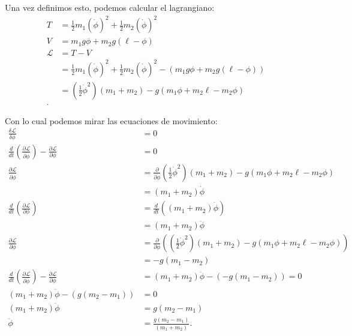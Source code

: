 \documentclass{report}
\begin{document}
Una vez definimos esto, podemos calcular el lagrangiano:
\begin{align*}
  T &= \frac{1}{2}m_1\left( \dot{\phi} \right)^2 + \frac{1}{2}m_2\left( \dot{\phi} \right)^2 \\
  V &= m_1g\phi + m_2g\left( \ell - \phi \right)  \\
  \mathcal{L} &= T - V \\
  &= \frac{1}{2}m_1\left( \dot{\phi} \right)^2 + \frac{1}{2}m_2\left( \dot{\phi} \right)^2 - \left( m_1g\phi + m_2g\left(\ell-\phi\right)\right)\\
  &= \left( \frac{1}{2}\dot{\phi}^2 \right)\left( m_1 + m_2 \right) - g\left( m_1\phi + m_2\ell - m_2\phi \right)  \\
.\end{align*}

Con lo cual podemos mirar las ecuaciones de movimiento:
\begin{align*}
  \frac{\delta \mathcal{L}}{\delta \phi} &= 0 \\
  \frac{d}{dt}\left( \frac{\partial \mathcal{L}}{\partial \dot{\phi}}  \right) - \frac{\partial \mathcal{L}}{\partial \phi} &= 0 \\
  \frac{\partial \mathcal{L}}{\partial \dot{\phi}} &= \frac{\partial}{\partial \dot{\phi}} \left( \frac{1}{2}\dot{\phi}^2 \right)\left( m_1 + m_2 \right) - g\left( m_1\phi + m_2\ell - m_2\phi \right) \\
						   &= \left( m_1 + m_2 \right) \dot{\phi} \\
  \frac{d}{dt}\left( \frac{\partial \mathcal{L}}{\partial \phi}  \right) &= \frac{d}{dt}\left( \left( m_1 + m_2 \right)\dot{\phi}  \right)  \\
									 &= \left( m_1 + m_2 \right) \ddot{\phi} \\
  \frac{\partial \mathcal{L}}{\partial \phi} &= \frac{\partial}{\partial \phi} \left(\left( \frac{1}{2}\dot{\phi}^2 \right)\left( m_1 + m_2 \right) - g\left( m_1\phi + m_2\ell - m_2\phi \right)  \right)  \\
  &= -g\left( m_1 - m_2 \right)  \\
  \frac{d}{dt}\left( \frac{\partial \mathcal{L}}{\partial \dot{\phi}}  \right) - \frac{\partial \mathcal{L}}{\partial \phi} &= \left( m_1 + m_2 \right) \ddot{\phi} - \left( -g\left( m_1 - m_2 \right) \right) = 0 \\
  \left( m_1 + m_2 \right) \ddot{\phi} - \left( g\left( m_2 - m_1 \right) \right) &= 0\\
  \left( m_1 + m_2 \right) \ddot{\phi} &= g\left( m_2 - m_1 \right)  \\
  \ddot{\phi} &= \frac{g\left( m_2 - m_1 \right) }{\left( m_1 + m_2 \right) }
.\end{align*}
\end{document}
